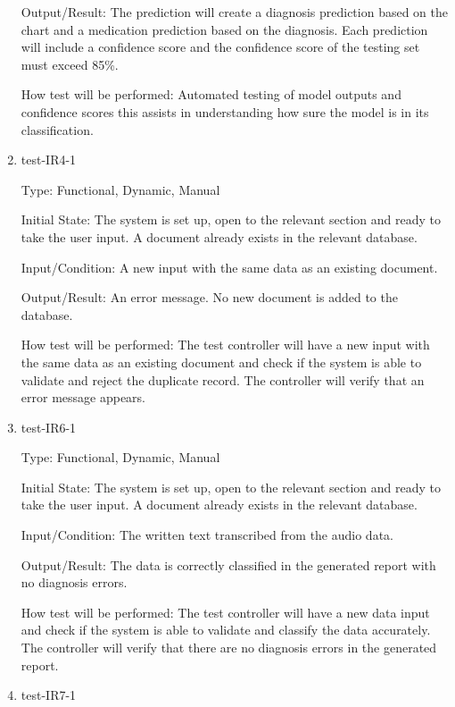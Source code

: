 \documentclass[12pt, titlepage]{article}
\begin{document}
\begin{enumerate}
    Output/Result: The prediction will create a diagnosis prediction based on the chart and a medication prediction based on the diagnosis. Each prediction will include a confidence score and the confidence score of the testing set must exceed 85\%.
    
    How test will be performed: Automated testing of model outputs and confidence scores this assists in understanding how sure the model is in its classification.

    \item{test-IR4-1} \label{test-IR4-1} %
    
    Type: Functional, Dynamic, Manual
    
    Initial State: The system is set up, open to the relevant section and ready to take the user input. A document already exists in the relevant database.
    
    Input/Condition: A new input with the same data as an existing document.
    
    Output/Result: An error message. No new document is added to the database.
    
    How test will be performed: The test controller will have a new input with the same data as an existing document and check if the system is able to validate and reject the duplicate record. The controller will verify that an error message appears.

    \item{test-IR6-1} \label{test-IR6-1} %
    
    Type: Functional, Dynamic, Manual
    
    Initial State: The system is set up, open to the relevant section and ready to take the user input. A document already exists in the relevant database.
    
    Input/Condition: The written text transcribed from the audio data.
    
    Output/Result: The data is correctly classified in the generated report with no diagnosis errors.
    
    How test will be performed: The test controller will have a new data input and check if the system is able to validate and classify the data accurately. The controller will verify that there are no diagnosis errors in the generated report.


    \item{test-IR7-1} \label{test-IR7-1} %
    

\end{enumerate}
\end{document}

